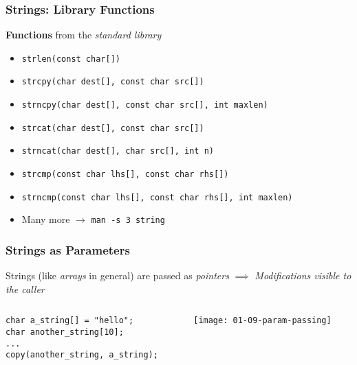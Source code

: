 \begin{frame}
  \frametitle{Strings: Library Functions}

  \textbf{Functions} from the \textit{standard library}

  \begin{itemize}
  \item \texttt{strlen(const char[])}
  \item \texttt{strcpy(char dest[], const char src[])}
  \item \texttt{strncpy(char dest[], const char src[], int maxlen)}
  \item \texttt{strcat(char dest[], const char src[])}
  \item \texttt{strncat(char dest[], char src[], int n)}
  \item \texttt{strcmp(const char lhs[], const char rhs[])}
  \item \texttt{strncmp(const char lhs[], const char rhs[], int maxlen)}
  \item Many more $\to$ \texttt{man -s 3 string}
  \end{itemize}
    
\end{frame}

\begin{frame}[fragile]
  \frametitle{Strings as Parameters}

  Strings (like \textit{arrays} in general) are passed as
  \textit{pointers} 
  \linebreak
  $\implies$ \textit{Modifications visible to the caller}

  \begin{block}{}
    \begin{columns}[c]
      \begin{column}{.5\textwidth}
        \begin{block}{}
\begin{verbatim}
char a_string[] = "hello";
char another_string[10];
...
copy(another_string, a_string);
\end{verbatim}
        \end{block}
      \end{column}
      \begin{column}{.4\textwidth}
        \texttt{[image: 01-09-param-passing]}
      \end{column}
    \end{columns}
  \end{block}

\end{frame}

